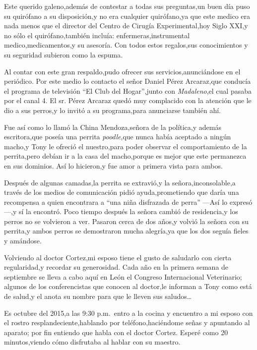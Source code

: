 \documentclass[letterpaper,12pt]{book}
\begin{document}
Este querido galeno,además de contestar a todas sus preguntas,un buen día puso su quirófano a su disposición,y no era cualquier quirófano,ya que este medico era nada menos que el director del Centro de Cirugía Experimental,hoy Siglo XXI,y no sólo el quirófano,también incluía: enfermeras,instrumental medico,medicamentos,y su asesoría. Con todos estos regalos,sus conocimientos y su seguridad subieron como la espuma.

Al contar con este gran respaldo,pudo ofrecer sus servicios,anunciándose en el periódico. Por este medio lo contacto el señor Daniel Pérez Arcaraz,que conducía el programa de televisión ``El Club del Hogar'',junto con \textit{Madaleno},el cual pasaba por el canal 4. El sr. Pérez Arcaraz quedó muy complacido con la atención que le dio a sus perros,y lo invitó a su programa,para anunciarse también ahí. 

Fue así como lo llamó la China Mendoza,señora de la política,y además escritora,que poseía una perrita \textit{poodle},que nunca había aceptado a ningún macho,y Tony le ofreció el nuestro,para poder observar el comportamiento de la perrita,pero debían ir a la casa del macho,porque es mejor que este permanezca en sus dominios. Así lo hicieron,y fue amor a primera vista para ambos.

Después de algunas camadas,la perrita se extravió,y la señora,inconsolable,a través de los medios de comunicación pidió ayuda,prometiendo que daría una recompensa a quien encontrara a ``una niña disfrazada de perra'' ---Así lo expresó---,y sí la encontró. Poco tiempo después la señora cambió de residencia,y los perros no se volvieron a ver. Pasaron cerca de dos años,y volvió la señora con su perrita,y ambos perros se demostraron mucha alegría,ya que los dos seguía fieles y amándose.

Volviendo al doctor Cortez,mi esposo tiene el gusto de saludarlo con cierta regularidad,y recordar su generosidad. Cada año en la primera semana de septiembre se lleva a cabo aquí en León el Congreso Internacional Veterinario; algunos de los conferencistas que conocen al doctor,le informan a Tony como está de salud,y el anota su nombre para que le lleven sus saludos\ldots

Es octubre del 2015,a las 9:30 p.m.\ entro a la cocina y encuentro a mi esposo con el rostro resplandeciente,hablando por teléfono,haciéndome señas y apuntando al aparato; por fin entiendo que habla con el doctor Cortez. Esperé como 20 minutos,viendo cómo disfrutaba al hablar con su maestro.
\end{document}
